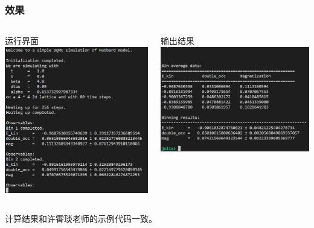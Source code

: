 \documentclass[UTF8]{ctexbeamer}
\begin{document}
\begin{frame}
\frametitle{效果}

\begin{columns}[T]

\begin{column}[T]{0.4\textwidth}
    运行界面
    \includegraphics[width=\textwidth]{main-running.PNG}
\end{column}

\begin{column}[T]{0.4\textwidth}
    输出结果
    \includegraphics[width=\textwidth]{main-result.PNG}
\end{column}

\end{columns}

\vspace{1em}

计算结果和许霄琰老师的示例代码一致。

\end{frame}
\end{document}
